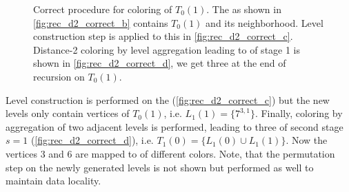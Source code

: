 \begin{figure}[thbp]
     	\centering
     	\hspace{0.6em}
     	\hspace{0.6em}
     	\hspace{0.6em}
     	\hspace{0.6em}
     	\caption{Correct procedure for \DTWO coloring of \levelGroup $T_0(1)$. The \subgraph as shown in \cref{fig:rec_d2_correct_b} contains \levelGroup $T_0(1)$ and its \DONE neighborhood. Level construction step is applied to this \subgraph in \cref{fig:rec_d2_correct_c}. Distance-2 coloring by level aggregation leading to \levelGroups of stage 1 is shown in \cref{fig:rec_d2_correct_d}, we get three \levelGroups at the end of recursion on $T_0(1)$.}
     	\label{fig:rec_d2_correct}
     \end{figure}
Level construction is performed on the \subgraph (\cref{fig:rec_d2_correct_c}) but the new levels only contain vertices of  $T_0(1)$, i.e. $L_1(1) = \{7^{3,1}\}$. Finally, \DTWO coloring by aggregation of two adjacent levels is performed, leading to three \levelGroups of second stage $s=1$ (\cref{fig:rec_d2_correct_d}), i.e. $T_1(0)=\{L_1(0) \cup L_1(1)\}$.  Now the vertices $3$ and $6$ are mapped to \levelGroups of different colors. Note, that the permutation step on the newly generated levels is not shown but performed as well to maintain data locality. 
    
